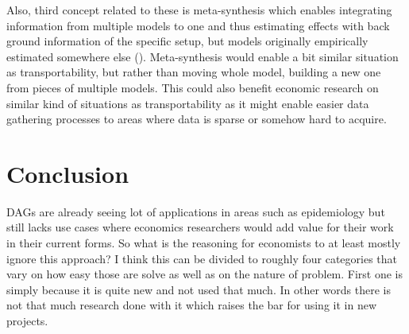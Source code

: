 \documentclass[main=english,12pt,a4paper,pdftex,econ,utf8]{aaltothesis}
\begin{document}
Also, third concept related to these is meta-synthesis which enables integrating information from multiple models to one and thus estimating effects with back ground information of the specific setup, but models originally empirically estimated somewhere else (\cite{Pearl2012a}). Meta-synthesis would enable a bit similar situation as transportability, but rather than moving whole model, building a new one from pieces of multiple models. This could also benefit economic research on similar kind of situations as transportability as it might enable easier data gathering processes to areas where data is sparse or somehow hard to acquire.


\begin{comment}
\hl{These} would enable using once done model in some place that must have same causal structure, but there might be some factors affecting the estimates differing from the original location to be used also in the second place. This would of course be again highly useful for economics and as selection recovery this might make implementing models for different settings much cheaper and thus also possible in smaller settings which might enable better policy recommendation and better decision making for smaller units such as municipalities. Also some complicated questions like how the social security system should be renewed in could be assessed more carefully with perhaps some research done in fairly similar setting in other country. Even thought this seems very promising and usable this is of course no silver bullet solving every problem. Even though there might be interesting use cases this requires the causal structure being exactly same to retain the causal interpretation and exactly same causal structures are of course in real world very hard to find.
\end{comment}

\clearpage

\section{Conclusion}

DAGs are already seeing lot of applications in areas such as epidemiology but still lacks use cases where economics researchers would add value for their work in their current forms. So what is the reasoning for economists to at least mostly ignore this approach? I think this can be divided to roughly four categories that vary on how easy those are solve as well as on the nature of problem. First one is simply because it is quite new and not used that much. In other words there is not that much research done with it which raises the bar for using it in new projects.
\end{document}
